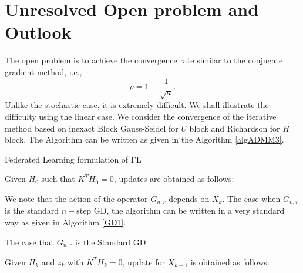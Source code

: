 \section{Unresolved Open problem and Outlook} 

The open problem is to achieve the convergence rate similar to the conjugate gradient method, i.e., 
\begin{equation}
\rho = 1 - \frac{1}{\sqrt{\kappa}}. 
\end{equation}
Unlike the stochastic case, it is extremely difficult. We shall illustrate the difficulty using the linear case. We consider the convergence of the iterative method based on inexact Block Gauss-Seidel for $U$ block and Richardson for $H$ block. The Algorithm can be written as given in the Algorithm \ref{algADMM3}.
\begin{algorithm}
\caption{Federated Learning formulation of FL}\label{algADMM3} 
Given $H_0$ such that $K^TH_0 = 0$, updates are obtained as follows:  
\begin{algorithmic}
\EndFor
\end{algorithmic}
\end{algorithm}
We note that the action of the operator $G_{n,r}$ depends on $X_k$. The case when $G_{n,r}$ is the standard $n-$step GD, the algorithm can be written in a very standard way as given in Algorithm \ref{GD1}. 
\begin{algorithm}
\caption{The case that $G_{n,r}$ is the Standard GD}\label{GD1} 
Given $H_k$ and $z_k$ with $K^TH_k = 0$, update for $X_{k+1}$ is obtained as follows:  
\begin{algorithmic}
\EndFor
\end{algorithmic}
\end{algorithm}

